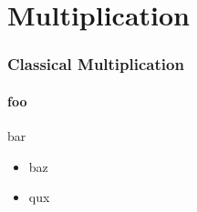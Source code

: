 \section{Multiplication}
\begin{frame}
  \frametitle{Classical Multiplication}
  \framesubtitle{foo}
  bar
        \begin{itemize}
            \item baz
                \pause
              \item qux
        \end{itemize}
\end{frame}
